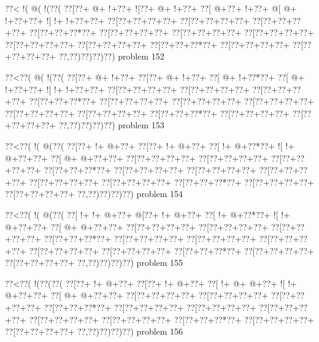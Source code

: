 \vbox{\vbox{\goo
\0??<\- !(\- @(\- !(\0??(
\0??[\0??+\- @+\- !+\0??+
\- ![\0??+\- @+\- !+\0??+
\0??[\- @+\0??+\- !+\0??+
\- @[\- @+\- !+\0??+\0??+
\- ![\- !+\- !+\0??+\0??+
\0??[\0??+\0??+\0??+\0??+
\0??[\0??+\0??+\0??+\0??+
\0??[\0??+\0??+\0??+\0??+
\0??[\0??+\0??+\0??*\0??+
\0??[\0??+\0??+\0??+\0??+
\0??[\0??+\0??+\0??+\0??+
\0??[\0??+\0??+\0??+\0??+
\0??[\0??+\0??+\0??+\0??+
\0??[\0??+\0??+\0??+\0??+
\0??[\0??+\0??+\0??*\0??+
\0??[\0??+\0??+\0??+\0??+
\0??[\0??+\0??+\0??+\0??+
\0??,\0??)\0??)\0??)\0??)
}
\hfil problem 152\hfil\break
}

\vbox{\vbox{\goo
\0??<\0??(\- @(\- !(\0??(
\0??[\0??+\- @+\- !+\0??+
\0??[\0??+\- @+\- !+\0??+
\0??[\- @+\- !+\0??*\0??+
\0??[\- @+\- !+\0??+\0??+
\- ![\- !+\- !+\0??+\0??+
\0??[\0??+\0??+\0??+\0??+
\0??[\0??+\0??+\0??+\0??+
\0??[\0??+\0??+\0??+\0??+
\0??[\0??+\0??+\0??*\0??+
\0??[\0??+\0??+\0??+\0??+
\0??[\0??+\0??+\0??+\0??+
\0??[\0??+\0??+\0??+\0??+
\0??[\0??+\0??+\0??+\0??+
\0??[\0??+\0??+\0??+\0??+
\0??[\0??+\0??+\0??*\0??+
\0??[\0??+\0??+\0??+\0??+
\0??[\0??+\0??+\0??+\0??+
\0??,\0??)\0??)\0??)\0??)
}
\hfil problem 153\hfil\break
}

\vbox{\vbox{\goo
\0??<\0??(\- !(\- @(\0??(
\0??[\0??+\- !+\- @+\0??+
\0??[\0??+\- !+\- @+\0??+
\0??[\- !+\- @+\0??*\0??+
\- ![\- !+\- @+\0??+\0??+
\0??[\- @+\- @+\0??+\0??+
\0??[\0??+\0??+\0??+\0??+
\0??[\0??+\0??+\0??+\0??+
\0??[\0??+\0??+\0??+\0??+
\0??[\0??+\0??+\0??*\0??+
\0??[\0??+\0??+\0??+\0??+
\0??[\0??+\0??+\0??+\0??+
\0??[\0??+\0??+\0??+\0??+
\0??[\0??+\0??+\0??+\0??+
\0??[\0??+\0??+\0??+\0??+
\0??[\0??+\0??+\0??*\0??+
\0??[\0??+\0??+\0??+\0??+
\0??[\0??+\0??+\0??+\0??+
\0??,\0??)\0??)\0??)\0??)
}
\hfil problem 154\hfil\break
}

\vbox{\vbox{\goo
\0??<\0??(\- !(\- @(\0??(
\0??[\- !+\- !+\- @+\0??+
\- @[\0??+\- !+\- @+\0??+
\0??[\- !+\- @+\0??*\0??+
\- ![\- !+\- @+\0??+\0??+
\0??[\- @+\- @+\0??+\0??+
\0??[\0??+\0??+\0??+\0??+
\0??[\0??+\0??+\0??+\0??+
\0??[\0??+\0??+\0??+\0??+
\0??[\0??+\0??+\0??*\0??+
\0??[\0??+\0??+\0??+\0??+
\0??[\0??+\0??+\0??+\0??+
\0??[\0??+\0??+\0??+\0??+
\0??[\0??+\0??+\0??+\0??+
\0??[\0??+\0??+\0??+\0??+
\0??[\0??+\0??+\0??*\0??+
\0??[\0??+\0??+\0??+\0??+
\0??[\0??+\0??+\0??+\0??+
\0??,\0??)\0??)\0??)\0??)
}
\hfil problem 155\hfil\break
}

\vbox{\vbox{\goo
\0??<\0??(\- !(\0??(\0??(
\0??[\0??+\- !+\- @+\0??+
\0??[\0??+\- !+\- @+\0??+
\0??[\- !+\- @+\- @+\0??+
\- ![\- !+\- @+\0??+\0??+
\0??[\- @+\- @+\0??+\0??+
\0??[\0??+\0??+\0??+\0??+
\0??[\0??+\0??+\0??+\0??+
\0??[\0??+\0??+\0??+\0??+
\0??[\0??+\0??+\0??*\0??+
\0??[\0??+\0??+\0??+\0??+
\0??[\0??+\0??+\0??+\0??+
\0??[\0??+\0??+\0??+\0??+
\0??[\0??+\0??+\0??+\0??+
\0??[\0??+\0??+\0??+\0??+
\0??[\0??+\0??+\0??*\0??+
\0??[\0??+\0??+\0??+\0??+
\0??[\0??+\0??+\0??+\0??+
\0??,\0??)\0??)\0??)\0??)
}
\hfil problem 156\hfil\break
}


